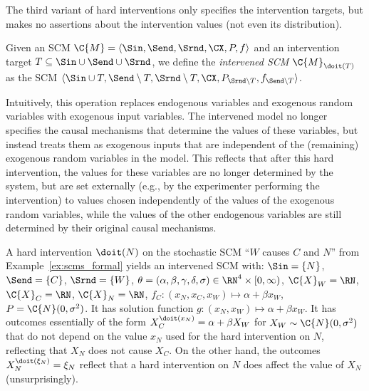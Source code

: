 The third variant of hard interventions only specifies the intervention targets, but makes
no assertions about the intervention values (not even its distribution).
\begin{Def}\label{def:scm_hard_intervention_unspecified}
  Given an SCM $\C{M} = \langle \Sin, \Send, \Srnd, \CX, P, f \rangle$
  and an intervention target $T \subseteq \Sin \cup \Send \cup \Srnd$, we define the \emph{intervened SCM
  $\C{M}_{\doit(T)}$} as the SCM $\langle \Sin \cup T,\Send \setminus T,\Srnd \setminus T,\CX,P_{\Srnd\setminus T},f_{\Send\setminus T} \rangle$.
\end{Def}
Intuitively, this operation replaces endogenous variables and exogenous random variables with exogenous input variables.
The intervened model no longer specifies the causal mechanisms that determine the values of these variables, 
but instead treats them as exogenous inputs that are independent of the (remaining) exogenous random variables in the model. 
This reflects that after this hard intervention, the values for
these variables are no longer determined by the system, but are set externally (e.g., by the 
experimenter performing the intervention) to values chosen independently of the values of the exogenous
random variables, while the values of the other endogenous variables are still
determined by their original causal mechanisms.
\begin{Eg}
  A hard intervention $\doit(N)$ on the stochastic SCM ``$W$ causes $C$ and $N$'' from Example~\ref{ex:scms_formal} 
  yields an intervened SCM with:
  $\Sin = \{N\}$, $\Send = \{C\}$, $\Srnd = \{W\}$, $\theta = (\alpha,\beta,\gamma,\delta,\sigma) \in \RN^4 \times [0,\infty)$, 
  $\C{X}_W = \RN$, $\C{X}_C = \RN$, $\C{X}_N = \RN$, $f_C : (x_N, x_C, x_W) \mapsto \alpha + \beta x_W$, $P = \C{N}(0,\sigma^2)$.
  It has solution function $g : (x_N, x_W) \mapsto \alpha + \beta x_W$. 
  It has outcomes essentially of the form $X_C^{\doit(x_N)} = \alpha + \beta X_W$ for
  $X_W \sim \C{N}(0,\sigma^2)$ that do not depend on the value $x_N$ used for the hard intervention on $N$,
  reflecting that $X_N$ does not cause $X_C$. On the other hand,
  the outcomes $X_N^{\doit(\xi_N)} = \xi_N$ reflect that a hard intervention on
  $N$ does affect the value of $X_N$ (unsurprisingly).
\end{Eg}

